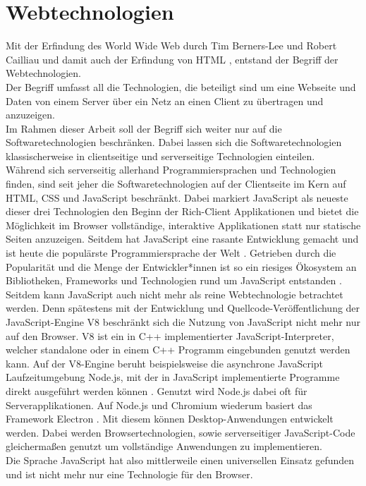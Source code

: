 \section{Webtechnologien}
\label{sec:webtechnologien}

Mit der Erfindung des World Wide Web durch Tim Berners-Lee und Robert Cailliau und damit auch der Erfindung 
von HTML \cite{www}, entstand der Begriff der Webtechnologien.\\
Der Begriff umfasst all die Technologien, die beteiligt sind um eine Webseite und Daten von einem Server über ein 
Netz an einen Client zu übertragen und anzuzeigen.\\

Im Rahmen dieser Arbeit soll der Begriff sich weiter nur auf die Softwaretechnologien beschränken. Dabei lassen
sich die Softwaretechnologien klassischerweise in clientseitige und serverseitige Technologien einteilen.\\
Während sich serverseitig allerhand Programmiersprachen und Technologien finden, sind seit jeher die Softwaretechnologien
auf der Clientseite im Kern auf HTML, CSS und JavaScript beschränkt. Dabei markiert JavaScript als neueste dieser
drei Technologien \cite{jspress} den Beginn der Rich-Client Applikationen und bietet die Möglichkeit im Browser 
vollständige, interaktive Applikationen statt nur statische Seiten anzuzeigen. Seitdem hat JavaScript eine rasante 
Entwicklung gemacht und ist heute die populärste Programmiersprache der Welt \cite{npmstat}. Getrieben durch 
die Popularität und die Menge der Entwickler*innen ist so ein riesiges Ökosystem an Bibliotheken, Frameworks
und Technologien rund um JavaScript entstanden \cite{npmstat}. Seitdem kann JavaScript auch nicht mehr als reine Webtechnologie
betrachtet werden.
Denn spätestens mit der Entwicklung und Quellcode-Veröffentlichung der JavaScript-Engine V8 \cite{v8} beschränkt 
sich die Nutzung von JavaScript nicht mehr nur auf den Browser. V8 ist ein in C++ implementierter JavaScript-Interpreter, 
welcher standalone oder in einem C++ Programm eingebunden genutzt werden kann. Auf der V8-Engine beruht beispielsweise 
die asynchrone JavaScript Laufzeitumgebung Node.js, mit der in JavaScript implementierte Programme direkt ausgeführt 
werden können \cite{node}. Genutzt wird Node.js dabei oft für Serverapplikationen.
Auf Node.js und Chromium wiederum basiert das Framework Electron \cite{electron}. Mit diesem können Desktop-Anwendungen
entwickelt werden. Dabei werden Browsertechnologien, sowie serverseitiger JavaScript-Code gleichermaßen
genutzt um vollständige Anwendungen zu implementieren.\\
Die Sprache JavaScript hat also mittlerweile einen universellen Einsatz gefunden 
und ist nicht mehr nur eine Technologie für den Browser.\\


